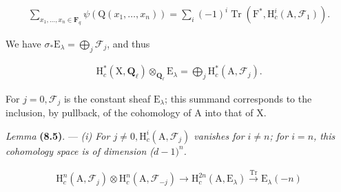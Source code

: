 \documentclass[10pt,leqno]{article}
\begin{document}
\begin{equation*}\begin{gathered}\sum _{x_{1},\ldots ,x_{n} \in  \mathbf{F}_{q}} \psi (\mathrm{Q}(x_{1},\ldots ,x_{n})) = \sum _{i} (-1)^{i} \operatorname{Tr}(\mathrm{F}^{*}, \mathrm{H}_{c}^{i}(\mathrm{A},\mathcal{F} _{1})).\end{gathered}\tag{8.4.2}\end{equation*}

\noindent We have \(\sigma _{*}\mathrm{E}_{\lambda } = \bigoplus\limits_{j} \mathcal{F} _{j}\), and thus\par

\begin{equation*}\begin{gathered}\mathrm{H}_{c}^{*}(\mathrm{X},\mathbf{Q}_{\ell }) \otimes _{\mathbf{Q}_{\ell }} \mathrm{E}_{\lambda } = \bigoplus\limits_{j} \mathrm{H}_{c}^{*}(\mathrm{A},\mathcal{F} _{j}).\end{gathered}\tag{8.4.3}\end{equation*}

\noindent For \(j = 0, \mathcal{F} _{j}\) is the constant sheaf \(\mathrm{E}_{\lambda }\); this summand corresponds to the inclusion, by pullback, of the cohomology of \(\mathrm{A}\) into that of \(\mathrm{X}\).\par

\noindent \emph{Lemma} \textbf{(8.5)}. — {\itshape \textup{(i)} For \(j \ne  0, \mathrm{H}_{c}^{i}(\mathrm{A},\mathcal{F} _{j})\) vanishes for \(i \ne  n\); for \(i = n\), this cohomology space is of dimension (\(d-1)^{n}\).}\par

\par

\begin{equation*}\begin{gathered}\mathrm{H}_{c}^{n}(\mathrm{A},\mathcal{F} _{j}) \otimes  \mathrm{H}_{c}^{n}(\mathrm{A},\mathcal{F} _{-j}) \longrightarrow  \mathrm{H}_{c}^{2n}(\mathrm{A},\mathrm{E}_{\lambda }) \xrightarrow{\operatorname{Tr}} \mathrm{E}_{\lambda }(-n)\end{gathered}\end{equation*}

\par

\par
\end{document}
